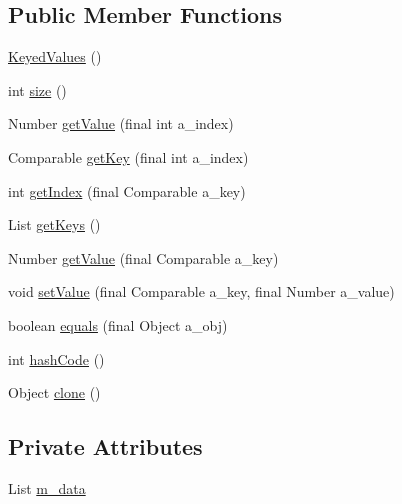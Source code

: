 \subsection*{Public Member Functions}
\begin{DoxyCompactItemize}
\item 
\hyperlink{classorg_1_1jgap_1_1audit_1_1_keyed_values_a366075a58bf937e6aa422c3aa55ba2c3}{Keyed\-Values} ()
\item 
int \hyperlink{classorg_1_1jgap_1_1audit_1_1_keyed_values_aa9340191936dfb2336842b5fa1b84d19}{size} ()
\item 
Number \hyperlink{classorg_1_1jgap_1_1audit_1_1_keyed_values_a46a444bf660fc15290d4563734a46d49}{get\-Value} (final int a\-\_\-index)
\item 
Comparable \hyperlink{classorg_1_1jgap_1_1audit_1_1_keyed_values_ab7446f8343d432260c4da2002a7ce761}{get\-Key} (final int a\-\_\-index)
\item 
int \hyperlink{classorg_1_1jgap_1_1audit_1_1_keyed_values_ab6c83c1bff395ef00f1c935190d8d389}{get\-Index} (final Comparable a\-\_\-key)
\item 
List \hyperlink{classorg_1_1jgap_1_1audit_1_1_keyed_values_a2844dd89c374cf44a660ef7b80569cc4}{get\-Keys} ()
\item 
Number \hyperlink{classorg_1_1jgap_1_1audit_1_1_keyed_values_a440ab00b98bed297a0a458ebc3fb39ab}{get\-Value} (final Comparable a\-\_\-key)
\item 
void \hyperlink{classorg_1_1jgap_1_1audit_1_1_keyed_values_a363b4080dc001e89088774eea31d6fdc}{set\-Value} (final Comparable a\-\_\-key, final Number a\-\_\-value)
\item 
boolean \hyperlink{classorg_1_1jgap_1_1audit_1_1_keyed_values_a6bff9318c58fb64860de3a07d3ee6e8c}{equals} (final Object a\-\_\-obj)
\item 
int \hyperlink{classorg_1_1jgap_1_1audit_1_1_keyed_values_aed6d6ab852f35c39d5a68be09e567ae9}{hash\-Code} ()
\item 
Object \hyperlink{classorg_1_1jgap_1_1audit_1_1_keyed_values_a0f2c9f93b9a3cb481472a303e9074f48}{clone} ()
\end{DoxyCompactItemize}
\subsection*{Private Attributes}
\begin{DoxyCompactItemize}
\item 
List \hyperlink{classorg_1_1jgap_1_1audit_1_1_keyed_values_a85fd2e828068e5d1f52ede867fe76de7}{m\-\_\-data}
\end{DoxyCompactItemize}
